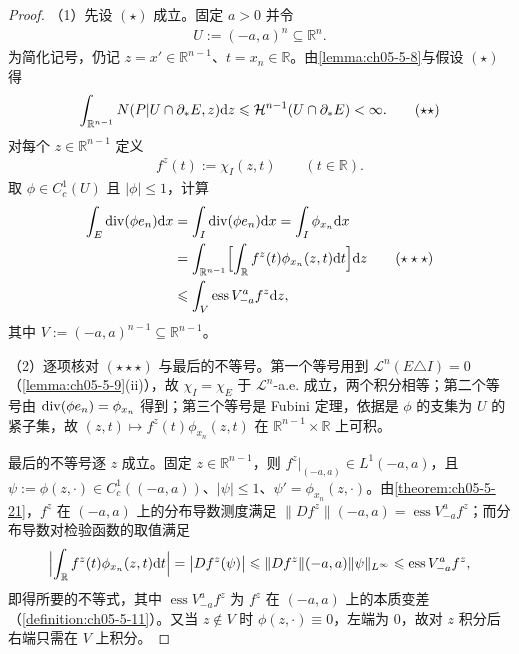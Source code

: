 \documentclass[../../main.tex]{subfiles}%
\begin{document}
\begin{proof}
（1）先设 $(\star)$ 成立。固定 $a>0$ 并令
\begin{align*}
U:=(-a,a)^n\subseteq\mathbb{R}^n.
\end{align*}
为简化记号，仍记 $z=x'\in\mathbb{R}^{n-1}$、$t=x_n\in\mathbb{R}$。由\cref{lemma:ch05-5-8}与假设 $(\star)$ 得 %
\begin{align*}
\int_{\mathbb{R}^{n-1}}N(P|U\cap\partial_*E,z)\mathrm{d} z\leqslant\mathcal{H}^{n-1}(U\cap\partial_*E)<\infty.\qquad(\star\star)
\end{align*}
对每个 $z\in\mathbb{R}^{n-1}$ 定义
\begin{align*}
f^z(t):=\chi_I(z,t)\qquad(t\in\mathbb{R}).
\end{align*}
取 $\phi\in C_c^1(U)$ 且 $\lvert\phi\rvert\leqslant1$，计算
\begin{align*}
\int_E\operatorname{div}(\phi e_n)\mathrm{d} x&=\int_I\operatorname{div}(\phi e_n)\mathrm{d} x=\int_I\phi_{x_n}\mathrm{d} x\\
&=\int_{\mathbb{R}^{n-1}}\Bigl[\int_{\mathbb{R}}f^z(t)\phi_{x_n}(z,t)\mathrm{d} t\Bigr]\mathrm{d} z\qquad(\star\star\star)\\
&\leqslant\int_V\operatorname{ess}V_{-a}^{a}f^z\mathrm{d} z,
\end{align*}
其中 $V:=(-a,a)^{n-1}\subseteq\mathbb{R}^{n-1}$。

（2）逐项核对 $(\star\star\star)$ 与最后的不等号。第一个等号用到 $\mathcal{L}^n(E\triangle I)=0$（\cref{lemma:ch05-5-9}(ii)），故 $\chi_I=\chi_E$ 于 $\mathcal{L}^n$-a.e. 成立，两个积分相等；第二个等号由 $\operatorname{div}(\phi e_n)=\phi_{x_n}$ 得到；第三个等号是 Fubini 定理，依据是 $\phi$ 的支集为 $U$ 的紧子集，故 $(z,t)\mapsto f^z(t)\phi_{x_n}(z,t)$ 在 $\mathbb{R}^{n-1}\times\mathbb{R}$ 上可积。%

最后的不等号逐 $z$ 成立。固定 $z\in\mathbb{R}^{n-1}$，则 $f^z|_{(-a,a)}\in L^1(-a,a)$，且 $\psi:=\phi(z,\cdot)\in C_c^1((-a,a))$、$\lvert\psi\rvert\leqslant1$、$\psi'=\phi_{x_n}(z,\cdot)$。由\cref{theorem:ch05-5-21}，$f^z$ 在 $(-a,a)$ 上的分布导数测度满足 $\lVert Df^z\rVert(-a,a)=\operatorname{ess}V_{-a}^{a}f^z$；而分布导数对检验函数的取值满足%
\begin{align*}
\Bigl\lvert\int_{\mathbb{R}}f^z(t)\phi_{x_n}(z,t)\mathrm{d} t\Bigr\rvert=\bigl\lvert Df^z(\psi)\bigr\rvert\leqslant\lVert Df^z\rVert(-a,a)\lVert\psi\rVert_{L^{\infty}}\leqslant\operatorname{ess}V_{-a}^{a}f^z ,
\end{align*}
即得所要的不等式，其中 $\operatorname{ess}V_{-a}^{a}f^z$ 为 $f^z$ 在 $(-a,a)$ 上的本质变差（\cref{definition:ch05-5-11}）。又当 $z\notin V$ 时 $\phi(z,\cdot)\equiv0$，左端为 $0$，故对 $z$ 积分后右端只需在 $V$ 上积分。%


\end{proof}
\end{document}
